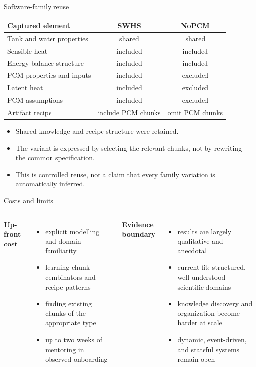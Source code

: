 \documentclass[aspectratio=169,10pt]{beamer}
\begin{document}
\begin{frame}{Software-family reuse}
\small
\begin{center}
\begin{tabular}{lcc}
\toprule
\textbf{Captured element} & \textbf{SWHS} & \textbf{NoPCM}\\
\midrule
Tank and water properties & shared & shared\\
Sensible heat             & included & included\\
Energy-balance structure  & included & included\\
PCM properties and inputs & included & excluded\\
Latent heat               & included & excluded\\
PCM assumptions           & included & excluded\\
\midrule
Artifact recipe           & include PCM chunks & omit PCM chunks\\
\bottomrule
\end{tabular}
\end{center}
\vspace{0.35em}
\begin{itemize}
  \item Shared knowledge and recipe structure were retained.
  \item The variant is expressed by selecting the relevant chunks, not by rewriting the common specification.
  \item This is controlled reuse, not a claim that every family variation is automatically inferred.
\end{itemize}
\end{frame}

\begin{frame}{Costs and limits}
\small
\begin{columns}[T,onlytextwidth]
\textbf{Up-front cost}
\begin{itemize}
  \item explicit modelling and domain familiarity
  \item learning chunk combinators and recipe patterns
  \item finding existing chunks of the appropriate type
  \item up to two weeks of mentoring in observed onboarding
\end{itemize}
\hfill
{}
\textbf{Evidence boundary}
\begin{itemize}
  \item results are largely qualitative and anecdotal
  \item current fit: structured, well-understood scientific domains
  \item knowledge discovery and organization become harder at scale
  \item dynamic, event-driven, and stateful systems remain open
\end{itemize}
\end{columns}
\end{frame}
\end{document}
